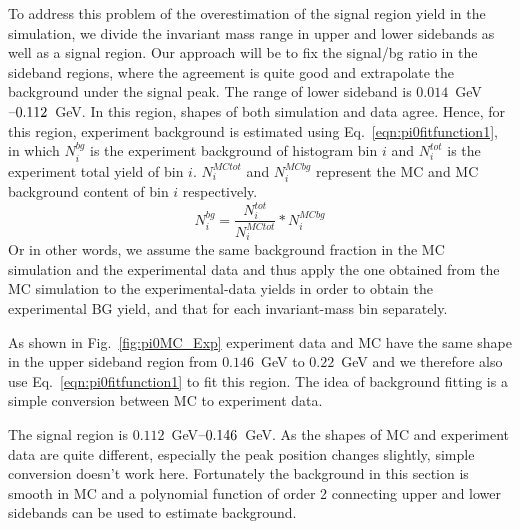 To address this problem of the overestimation of the signal region yield in the simulation, we divide the invariant mass range in upper and lower sidebands as well as a signal region. Our approach will be to fix the signal/bg ratio in the sideband regions, where the agreement is quite good and extrapolate the background under the signal peak.	 The range of lower sideband is $0.014$~GeV$\textup{--}0.112$~GeV. In this region, shapes of both simulation and data agree. Hence, for this region, experiment background is estimated using Eq.~\eqref{eqn:pi0fitfunction1}, in which $N_i^{bg}$ is the experiment background of histogram bin $i$ and $N_i^{tot}$ is the experiment total yield of bin $i$. $N_i^{MCtot}$ and $N_i^{MCbg}$ represent the MC and MC background content of bin $i$ respectively.  
\begin{equation}
N_i^{bg}=\frac{N_i^{tot}}{N_i^{MCtot}}*N_i^{MCbg}
\label{eqn:pi0fitfunction1}
\end{equation}
Or in other words, we assume the same background fraction in the MC simulation and the experimental data and thus apply the one obtained from the MC simulation to the experimental-data yields in order to obtain the experimental BG yield, and that for each invariant-mass bin separately.


As shown in Fig.~\ref{fig:pi0MC_Exp} experiment data and MC have the same shape in the upper sideband region from $0.146$~GeV to $0.22$~GeV and we therefore also use Eq.~\eqref{eqn:pi0fitfunction1} to fit this region. The idea of background fitting is a simple conversion between MC to experiment data.

The signal region is $0.112$~GeV$\textup{--}0.146$~GeV. As the shapes of MC and experiment data are quite different, especially the peak position changes slightly, simple conversion doesn't work here. Fortunately the background in this section is smooth in MC and a polynomial function of order 2 connecting upper and lower sidebands can be used to estimate background.

